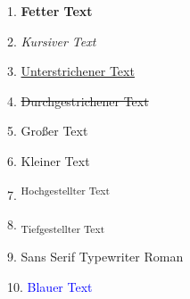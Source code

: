 \documentclass{article}
\begin{document}
1. \textbf{Fetter Text}

2. \textit{Kursiver Text}

3. \underline{Unterstrichener Text}

4. \sout{Durchgestrichener Text}

5. {\large Großer Text}

6. {\small Kleiner Text}

7. \textsuperscript{Hochgestellter Text}

8. \textsubscript{Tiefgestellter Text}

9. {\sffamily Sans Serif} {\ttfamily Typewriter} {\rmfamily Roman}

10. \textcolor{blue}{Blauer Text}
\end{document}
